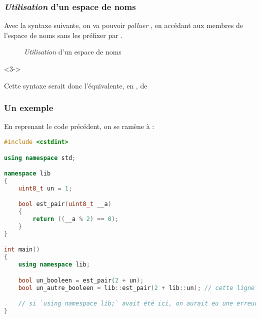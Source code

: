 \documentclass{cppcourses}
\begin{document}
\begin{frame}

\frametitle{\emph{Utilisation} d'un espace de noms}

Avec la syntaxe suivante, on va pouvoir \emph{polluer} , en accédant aux membres de l'espace de noms \mykeyword{\textcolor{red}{espace de noms}} sans les préfixer par \mykeyword{\textcolor{red}{<espace de noms>}::}.

\begin{figure}
\caption{\emph{Utilisation} d'un espace de noms}
\end{figure}


\begin{uncoverenv}<3->

Cette syntaxe serait donc l'équivalente, en , de

\begin{figure}
\end{figure}

\end{uncoverenv}

\end{frame}

\begin{frame}[fragile]

\frametitle{Un exemple}

\begin{example}

En reprenant le code précédent, on se ramène à :

\begin{lstlisting}[language = c++]
#include <cstdint>

using namespace std;

namespace lib
{
    uint8_t un = 1;

    bool est_pair(uint8_t __a)
    {
        return ((__a % 2) == 0);
    }
}

int main()
{
    using namespace lib;

    bool un_booleen = est_pair(2 + un);
    bool un_autre_booleen = lib::est_pair(2 + lib::un); // cette ligne fonctionne également

    // si `using namespace lib;` avait été ici, on aurait eu une erreur à la compilation
}
\end{lstlisting}

\end{example}

\end{frame}
\end{document}
